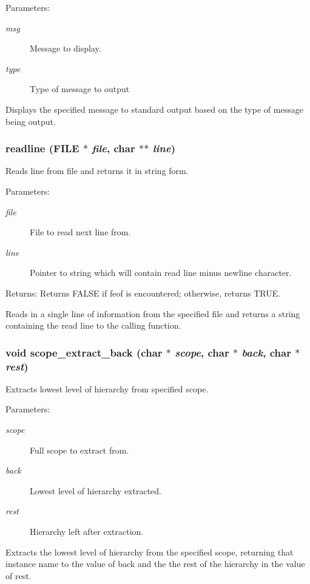 \begin{Desc}
\item[Parameters:]
\begin{description}
\item[{\em msg}]Message to display. \item[{\em type}]Type of message to output\end{description}
\end{Desc}
Displays the specified message to standard output based on the type of message being output. 
\subsubsection{ readline (FILE $\ast$ {\em file}, char $\ast$$\ast$ {\em line})}\label{util_8c_a13}


Reads line from file and returns it in string form.

\begin{Desc}
\item[Parameters:]
\begin{description}
\item[{\em file}]File to read next line from. \item[{\em line}]Pointer to string which will contain read line minus newline character.\end{description}
\end{Desc}
\begin{Desc}
\item[Returns:]Returns FALSE if feof is encountered; otherwise, returns TRUE.\end{Desc}
Reads in a single line of information from the specified file and returns a string containing the read line to the calling function. 
\subsubsection{\setlength{\rightskip}{0pt plus 5cm}void scope\_\-extract\_\-back (char $\ast$ {\em scope}, char $\ast$ {\em back}, char $\ast$ {\em rest})}\label{util_8c_a15}


Extracts lowest level of hierarchy from specified scope.

\begin{Desc}
\item[Parameters:]
\begin{description}
\item[{\em scope}]Full scope to extract from. \item[{\em back}]Lowest level of hierarchy extracted. \item[{\em rest}]Hierarchy left after extraction.\end{description}
\end{Desc}
Extracts the lowest level of hierarchy from the specified scope, returning that instance name to the value of back and the the rest of the hierarchy in the value of rest. 
